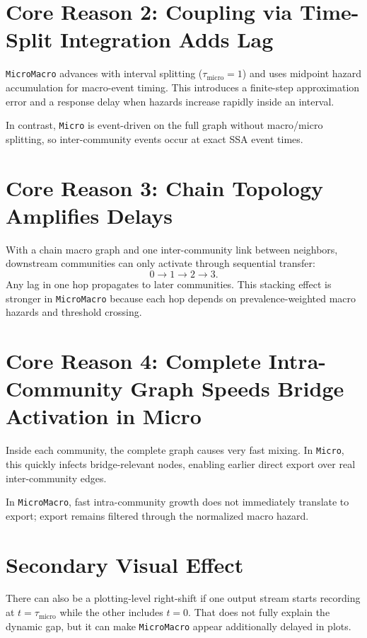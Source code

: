 \documentclass[11pt]{article}
\begin{document}
\section*{Core Reason 2: Coupling via Time-Split Integration Adds Lag}
\texttt{MicroMacro} advances with interval splitting (\(\tau_{\text{micro}}=1\)) and uses midpoint hazard accumulation for macro-event timing. This introduces a finite-step approximation error and a response delay when hazards increase rapidly inside an interval.

In contrast, \texttt{Micro} is event-driven on the full graph without macro/micro splitting, so inter-community events occur at exact SSA event times.

\section*{Core Reason 3: Chain Topology Amplifies Delays}
With a chain macro graph and one inter-community link between neighbors, downstream communities can only activate through sequential transfer:
\[
0 \rightarrow 1 \rightarrow 2 \rightarrow 3.
\]
Any lag in one hop propagates to later communities. This stacking effect is stronger in \texttt{MicroMacro} because each hop depends on prevalence-weighted macro hazards and threshold crossing.

\section*{Core Reason 4: Complete Intra-Community Graph Speeds Bridge Activation in Micro}
Inside each community, the complete graph causes very fast mixing. In \texttt{Micro}, this quickly infects bridge-relevant nodes, enabling earlier direct export over real inter-community edges.

In \texttt{MicroMacro}, fast intra-community growth does not immediately translate to export; export remains filtered through the normalized macro hazard.

\section*{Secondary Visual Effect}
There can also be a plotting-level right-shift if one output stream starts recording at $t=\tau_{\text{micro}}$ while the other includes $t=0$. That does not fully explain the dynamic gap, but it can make \texttt{MicroMacro} appear additionally delayed in plots.
\end{document}
